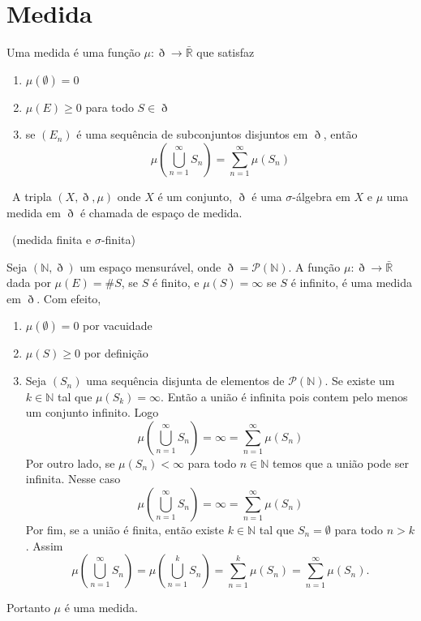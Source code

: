 \documentclass[a4paper, 11pt]{book}
\theoremstyle{definition}
\newcommand{\obs}{\noindent{\textbf{\textcolor{black}{\sffamily Observação:}}}~}
\newcommand{\bN}{\mathbb{N}}
\newcommand{\cP}{\mathcal{P}}
\begin{document}
\begin{ex}
    
\end{ex}

\section{Medida}

\begin{dbox}
    Uma medida é uma função $\mu : \eth \to \bar{\mathbb{R}}$ que satisfaz
    \begin{enumerate}[leftmargin=*]
        \item $\mu(\emptyset) = 0$
        \item $\mu(E) \geqslant 0$ para todo $S \in \eth$
        \item se $(E_n)$ é uma sequência de subconjuntos disjuntos em $\eth$, então
        \[
            \mu \left( \bigcup_{n=1}^{\infty} S_n \right) = \sum_{n=1}^{\infty} \mu(S_n)
        \]
    \end{enumerate}
\end{dbox}

\obs A tripla $(X,\eth,\mu)$ onde $X$ é um conjunto, $\eth$ é uma $\sigma$-álgebra em $X$ e $\mu$ uma medida em $\eth$ é chamada de espaço de medida.

\obs (medida finita e $\sigma$-finita)

\begin{ex}
    Seja $(\mathbb{N}, \eth)$ um espaço mensurável, onde $\eth = \mathcal P (\mathbb N)$.
    A função $\mu : \eth \to \bar{\mathbb R}$ dada por $\mu(E) = \# S$, se $S$ é finito, e $\mu(S) = \infty$ se $S$ é infinito, é uma medida em $\eth$.
    Com efeito,
    \begin{enumerate}[leftmargin=*]
        \item $\mu(\emptyset) = 0$ por vacuidade
        \item $\mu(S) \geqslant 0$ por definição
        \item Seja $(S_n)$ uma sequência disjunta de elementos de $\cP(\bN)$. 
        Se existe um $k \in \bN$ tal que $\mu(S_k) = \infty$. Então a união é infinita pois contem pelo menos um conjunto infinito.
        Logo
        \[
            \mu\left( \bigcup_{n=1}^{\infty} S_n \right) = \infty = \sum_{n=1}^{\infty} \mu(S_n)
        \]
        Por outro lado, se $\mu(S_n) < \infty$ para todo $n \in \bN$ temos que a união pode ser infinita.
        Nesse caso
        \[
            \mu\left( \bigcup_{n=1}^{\infty} S_n \right) = \infty = \sum_{n=1}^{\infty} \mu(S_n)
        \]
        Por fim, se a união é finita, então existe $k \in \bN$ tal que $S_n = \emptyset$ para todo $n > k$. Assim
        \[
            \mu\left( \bigcup_{n=1}^{\infty} S_n \right) =\mu\left( \bigcup_{n=1}^{k} S_n \right) = \sum_{n=1}^{k} \mu(S_n) = \sum_{n=1}^{\infty} \mu(S_n).
        \]
    \end{enumerate}
    Portanto $\mu$ é uma medida.
\end{ex}
\end{document}
